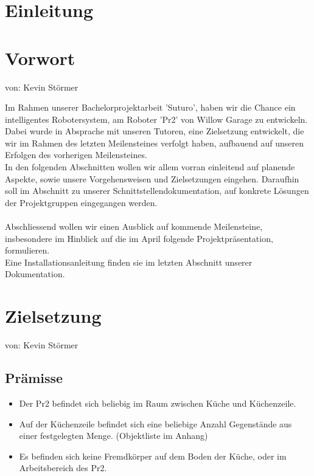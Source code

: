 \documentclass{suturo}
\begin{document}

\makeatletter
\newcommand{\chapterauthor}[1]{%
  {\parindent0pt\vspace*{-27pt}%
  \linespread{0}\small\begin{flushright}von: #1\end{flushright}%
  \par\nobreak\vspace*{0pt}}
  \@afterheading%
}
\makeatother


\section*{Einleitung}
\section{Vorwort}
\chapterauthor{Kevin Störmer}
Im Rahmen unserer Bachelorprojektarbeit 'Suturo', haben wir die Chance ein intelligentes Robotersystem, am Roboter 'Pr2' von Willow Garage zu entwickeln. \\
Dabei wurde in Absprache mit unseren Tutoren, eine Zielsetzung entwickelt, die wir im Rahmen des letzten Meilensteines verfolgt haben, aufbauend auf unseren Erfolgen des vorherigen Meilensteines. \\
In den folgenden Abschnitten wollen wir allem vorran einleitend auf planende Aspekte, sowie unsere Vorgehensweisen und Zielsetzungen eingehen. Daraufhin soll im Abschnitt zu unserer Schnittstellendokumentation, auf konkrete Lösungen der Projektgruppen eingegangen werden.\\ ~ \\
Abschliessend wollen wir einen Ausblick auf kommende Meilensteine, insbesondere im Hinblick auf die im April folgende Projektpräsentation, formulieren.\\
Eine Installationsanleitung finden sie im letzten Abschnitt unserer Dokumentation.



\newpage

\section{Zielsetzung}
\chapterauthor{Kevin Störmer}
\subsection{Prämisse}
\begin{itemize}
\item Der Pr2 befindet sich beliebig im Raum zwischen Küche und Küchenzeile.
\item Auf der Küchenzeile befindet sich eine beliebige Anzahl Gegenstände aus einer festgelegten Menge. (Objektliste im Anhang)
\item Es befinden sich keine Fremdkörper auf dem Boden der Küche, oder im Arbeitsbereich des Pr2.
\end{itemize}
\end{document}
